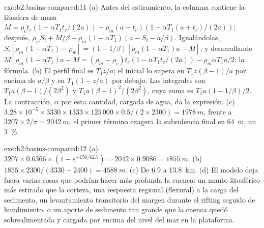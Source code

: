\begin{solution}{exo:b2:basins-compared:11}
(a) Antes del estiramiento, la columna contiene la litosfera de masa $M = \rho_c t_c(1 - \alpha T_1
t_c/(2a)) + \rho_m(a - t_c)(1 - \alpha T_1(a + t_c)/(2a))$; después, $\rho_w S_i + M/\beta +
\rho_m(1 - \alpha T_1)(a - S_i - a/\beta)$. Igualándolas, $S_i[\rho_m(1 - \alpha T_1) - \rho_w] =
(1 - 1/\beta)[\rho_m(1 - \alpha T_1)a - M]$, y desarrollando $M$, $\rho_m(1 - \alpha T_1)a - M =
(\rho_m - \rho_c)t_c(1 - \alpha T_1 t_c/(2a)) - \rho_m\alpha T_1 a/2$: la fórmula. (b) El perfil final es $T_1 z/a$; el inicial lo supera
en $T_1 z(\beta - 1)/a$ por encima de $a/\beta$ y en $T_1(1 - z/a)$ por debajo. Las integrales son $T_1
a(\beta - 1)/(2\beta^2)$ y $T_1 a(\beta - 1)^2/(2\beta^2)$, cuya suma es $T_1 a(1 - 1/\beta)/2$.
La contracción, $\alpha$ por esta cantidad, cargada de agua, da la expresión. (c) $3.28\times10^{-5}
\times3330\times1333\times125\,000\times0.5/(2\times2300) = \qty{1978}{m}$, frente a $3207\times
2/\pi = \qty{2042}{m}$: el primer término exagera la subsidencia final en \qty{64}{m}, un
\qty{3}{\percent}.
\end{solution}

\begin{solution}{exo:b2:basins-compared:12}
(a) $3207\times0.6366\times(1 - e^{-150/62.7}) = 2042\times0.9086 = \qty{1855}{m}$. (b) $1855\times
2300/(3330 - 2400) = \qty{4588}{m}$. (c) De 6.9 a \qty{13.8}{km}. (d) El modelo deja fuera varias
cosas que podrían hacer más profunda la cuenca: un manto litosférico más estirado que la corteza, una respuesta regional
(flexural) a la carga del sedimento, un levantamiento transitorio del margen durante el rifting
seguido de hundimiento, o un aporte de sedimento tan grande que la cuenca quedó sobrealimentada y cargada
por encima del nivel del mar en la plataforma.
\end{solution}

